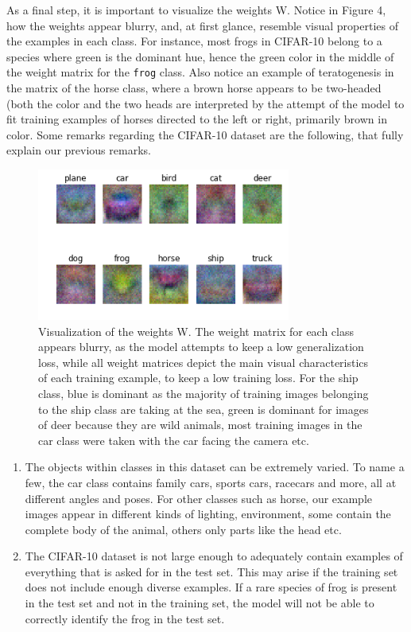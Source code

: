 \documentclass{article}
\def\code#1{\texttt{#1}}
\begin{document}
    
    As a final step, it is important to visualize the weights W. Notice in Figure 4, how the weights appear blurry, and, at first glance, resemble visual properties of the examples in each class. For instance, most frogs in CIFAR-10 belong to a species where green is the dominant hue, hence the green color in the middle of the weight matrix for the \code{frog} class. Also notice an example of teratogenesis in the matrix of the horse class, where a brown horse appears to be two-headed (both the color and the two heads are interpreted by the attempt of the model to fit training examples of horses directed to the left or right, primarily brown in color. Some remarks regarding the CIFAR-10 dataset are the following, that fully explain our previous remarks. \\
   
    \begin{figure}[t]
    	\centering
    	\includegraphics[height=5cm]{images/weights.png}
    	\caption{Visualization of the weights W. The weight matrix for each class appears blurry, as the model attempts to keep a low generalization loss, while all weight matrices depict the main visual characteristics of each training example, to keep a low training loss. For the ship class, blue is dominant as the majority of training images belonging to the ship class are taking at the sea, green is dominant for images of deer because they are wild animals, most training images in the car class were taken with the car facing the camera etc.}
    \end{figure}
    
    
    \begin{enumerate}
    	\item The objects within classes in this dataset can be extremely varied. To name a few, the car class contains family cars, sports cars, racecars and more, all at different angles and poses. For other classes such as horse, our example images appear in different kinds of lighting, environment, some contain the complete body of the animal, others only parts like the head etc. 
    	\item The CIFAR-10 dataset is not large enough to adequately contain examples of everything that is asked for in the test set. This may arise if the training set does not include enough diverse examples. If a rare species of frog is present in the test set and not in the training set, the model will not be able to correctly identify the frog in the test set.
    \end{enumerate}
\end{document}
